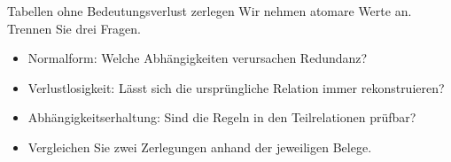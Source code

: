 \begin{frame}[t]{Tabellen ohne Bedeutungsverlust zerlegen}
Wir nehmen atomare Werte an. Trennen Sie drei Fragen.
\medskip
\begin{itemize}
\item Normalform: Welche Abhängigkeiten verursachen Redundanz?
\item Verlustlosigkeit: Lässt sich die ursprüngliche Relation immer rekonstruieren?
\item Abhängigkeitserhaltung: Sind die Regeln in den Teilrelationen prüfbar?
\item Vergleichen Sie zwei Zerlegungen anhand der jeweiligen Belege.
\end{itemize}
\end{frame}
